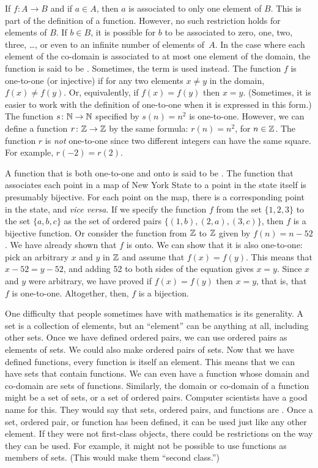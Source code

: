 If $f\colon A\to B$ and if $a\in A$, then $a$ is associated to
only one element of $B$.  This is part of the definition of
a function.  However, no such restriction holds for elements
of $B$.  If $b\in B$, it is possible for $b$ to be associated
to zero, one, two, three, \dots, or even to an infinite
number of elements of~$A$.  In the case where each element of
the co-domain is associated to at most one element of the domain,
the function is said to be .  Sometimes,
the term  is used instead.  The function $f$
is one-to-one (or injective) if for any two elements $x \neq y$ in
the domain, $f(x)\neq f(y)$.
Or, equivalently, if $f(x) = f(y)$ then $x = y$.
(Sometimes, it is easier to work with the definition of one-to-one when it is expressed in this form.)
The function $s\colon{\mathbb N}\to{\mathbb N}$ specified by $s(n)=n^2$ is one-to-one.
However, we can define a function $r\colon{\mathbb Z}\to{\mathbb Z}$ by the same formula:
$r(n)=n^2$, for $n\in{\mathbb Z}$.
The function $r$ is \emph{not} one-to-one since two different integers can have the same square.
For example, $r(-2)=r(2)$.

A function that is both one-to-one and onto is said to be .
The function that associates each point in a map of New York State to a point in the state itself is presumably bijective.
For each point on the map, there is a corresponding point in the state, and \textit{vice versa}.
If we specify the function $f$ from the set $\{1,2,3\}$ to the set $\{a,b,c\}$ as the set of ordered pairs $\{(1,b),(2,a),(3,c)\}$, then $f$ is a bijective function.
Or consider the function from ${\mathbb Z}$ to ${\mathbb Z}$ given by $f(n) = n-52$.
We have already shown that $f$ is onto.
We can show that it is also one-to-one: 
pick an arbitrary $x$ and $y$ in ${\mathbb Z}$ and assume that $f(x) = f(y)$.
This means that $x-52 = y-52$, and adding 52 to both sides of the equation gives $x=y$.
Since $x$ and $y$ were arbitrary, we have proved if $f(x)=f(y)$ then $x=y$, that is, that $f$ is one-to-one.
Altogether, then, $f$ is a bijection.


\medbreak

One difficulty that people sometimes have with mathematics is its generality.
A set is a collection of elements, but an ``element'' can be anything at all, including other sets.
Once we have defined ordered pairs, we can use ordered pairs as elements of sets.
We could also make ordered pairs of sets.
Now that we have defined functions, every function is itself an element.
This means that we can have sets that contain functions.
We can even have a function whose domain and co-domain are sets of functions.
Similarly, the domain or co-domain of a function might be a set of sets, or a set of ordered pairs.
Computer scientists have a good name for this.
They would say that sets, ordered pairs, and functions are .
Once a set, ordered pair, or function has been defined, it can be used just like any other element.
If they were not first-class objects, there could be restrictions on the way they can be used.
For example, it might not be possible to use functions as members of sets.
(This would make them ``second class.'')

